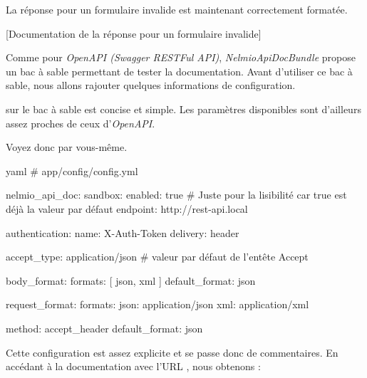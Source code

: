 \documentclass[big]{zmdocument}
\begin{document}
La réponse pour un formulaire invalide est maintenant correctement formatée.



[Documentation de la réponse pour un formulaire invalide]




Comme pour \textit{OpenAPI (Swagger RESTFul API)}, \textit{NelmioApiDocBundle} propose un bac à sable permettant de tester la documentation. Avant d'utiliser ce bac à sable, nous allons rajouter quelques informations de configuration.





 sur le bac à sable est concise et simple. Les paramètres disponibles sont d'ailleurs assez proches de ceux d'\textit{OpenAPI}.



Voyez donc par vous-même.



\begin{CodeBlock}{yaml}
# app/config/config.yml

nelmio_api_doc:
    sandbox:
        enabled:  true  # Juste pour la lisibilité car true est déjà la valeur par défaut
        endpoint: http://rest-api.local

        authentication:
            name: X-Auth-Token
            delivery: header

        accept_type: application/json   # valeur par défaut de l'entête Accept

        body_format:
            formats: [ json, xml ]                                 
            default_format: json                

        request_format:
            formats:                           
                json: application/json         
                xml: application/xml           

            method: accept_header     
            default_format: json    
\end{CodeBlock}



Cette configuration est assez explicite et se passe donc de commentaires. En accédant à la documentation avec l'URL , nous obtenons :
\end{document}
